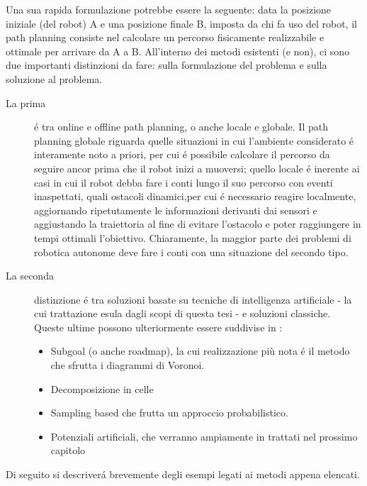 \documentclass[14pt,a4paper]{extarticle}
\begin{document}
Una sua rapida formulazione potrebbe essere la seguente: data la posizione iniziale (del robot) A e una posizione finale B, imposta da chi fa uso del robot, il path planning consiste nel calcolare un percorso fisicamente realizzabile e ottimale per arrivare da A a B.
All'interno dei metodi esistenti (e non), ci sono due importanti distinzioni da fare: sulla formulazione del problema e sulla soluzione al problema.
\begin{description}
\item[La prima] é tra online e offline path planning, o anche locale e globale. Il path planning globale riguarda quelle situazioni in cui l'ambiente considerato é interamente noto a priori, per cui é possibile calcolare il percorso da seguire ancor prima che il robot inizi a muoversi; quello locale é inerente ai casi in cui il robot debba fare i conti lungo il suo percorso con eventi inaspettati, quali ostacoli dinamici,per cui é necessario reagire localmente, aggiornando ripetutamente le informazioni derivanti dai sensori e aggiustando la traiettoria al fine di evitare l'ostacolo e poter raggiungere in tempi ottimali l'obiettivo. Chiaramente, la maggior parte dei problemi di robotica autonome deve fare i conti con una situazione del secondo tipo. 
\item[La seconda] distinzione é tra soluzioni basate su tecniche di intelligenza artificiale - la cui trattazione esula dagli scopi di questa tesi - e soluzioni classiche. Queste ultime possono ulteriormente essere suddivise in \cite{siciliano}:
\begin{itemize}
\item Subgoal (o anche roadmap), la cui realizzazione più nota é il metodo che sfrutta i diagrammi di Voronoi. 
\item Decomposizione in celle
\item Sampling based che frutta un approccio probabilistico.
\item Potenziali artificiali, che verranno ampiamente in trattati nel prossimo capitolo
\end{itemize}
\end{description}

Di seguito si descriverá brevemente degli esempi legati ai metodi appena elencati.
\end{document}
